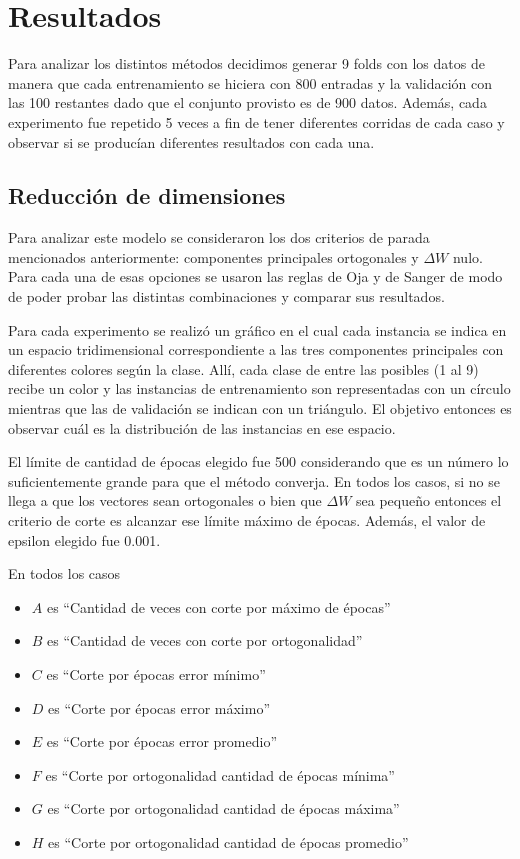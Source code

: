 \documentclass[informe.tex]{subfiles}
\begin{document}
  
  \section{Resultados}
    Para analizar los distintos métodos decidimos generar 9 folds con los datos de manera que cada entrenamiento se hiciera con 800 entradas y la validación con las 100 restantes dado que el conjunto provisto es de 900 datos. Además, cada experimento fue repetido 5 veces a fin de tener diferentes corridas de cada caso y observar si se produc\'ian diferentes resultados con cada una.
    
    \subsection{Reducción de dimensiones}
      Para analizar este modelo se consideraron los dos criterios de parada mencionados anteriormente: componentes principales ortogonales y $\Delta W$ nulo. Para cada una de esas opciones se usaron las reglas de Oja y de Sanger de modo de poder probar las distintas combinaciones y comparar sus resultados. 
      
      Para cada experimento se realizó un gráfico en el cual cada instancia se indica en un espacio tridimensional correspondiente a las tres componentes principales con diferentes colores según la clase. Allí, cada clase de entre las posibles (1 al 9) recibe un color y las instancias de entrenamiento son representadas con un círculo mientras que las de validación se indican con un triángulo. El objetivo entonces es observar cuál es la distribución de las instancias en ese espacio.
      
      El l\'imite de cantidad de \'epocas elegido fue 500 considerando que es un n\'umero lo suficientemente grande para que el método converja. En todos los casos, si no se llega a que los vectores sean ortogonales o bien que $\Delta W$ sea pequeño entonces el criterio de corte es alcanzar ese límite máximo de épocas. Además, el valor de epsilon elegido fue 0.001.
      
      En todos los casos 
      \begin{itemize}
       \item $A$ es ``Cantidad de veces con corte por máximo de épocas''
       \item $B$ es ``Cantidad de veces con corte por ortogonalidad''
       \item $C$ es ``Corte por épocas error mínimo''
       \item $D$ es ``Corte por épocas error máximo''
       \item $E$ es ``Corte por épocas error promedio''
       \item $F$ es ``Corte por ortogonalidad cantidad de épocas mínima''
       \item $G$ es ``Corte por ortogonalidad cantidad de épocas máxima''
       \item $H$ es ``Corte por ortogonalidad cantidad de épocas promedio''
      \end{itemize}
 
\end{document}
